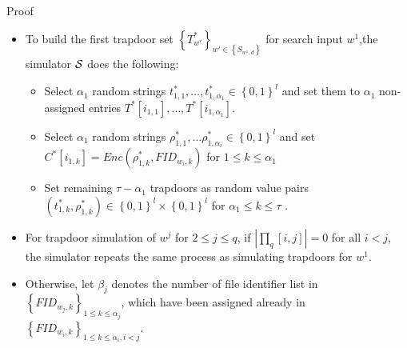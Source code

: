 \documentclass{beamer}
\begin{document}
\begin{frame}{Proof}
	\begin{itemize}
		\item To build the first trapdoor set ${\left\{ {T_{w'}^*} \right\}_{w' \in \left\{ {{S_{{w^1},d}}} \right\}}}$ for search input $w^1$,the simulator $\cal S$ does the following:
		\begin{itemize}
			\item Select ${\alpha_1}$ random strings $t_{1,1}^*, \ldots ,t_{1,{\alpha _1}}^* \in {\left\{ {0,1} \right\}^l}$ and set them to ${\alpha _1}$ non-assigned entries ${T^*}[{i_{1,1}}], \ldots ,{T^*}[{i_{1,{\alpha _1}}}]$.
			\item Select ${\alpha_1}$ random strings $\rho _{1,1}^*, \ldots \rho _{1,{\alpha _i}}^* \in {\left\{ {0,1} \right\}^l}$ and set ${C^*}[{i_{1,k}}] = Enc(\rho _{1,k}^*,FI{D_{{w_i},k}})$ for $1 \le k \le {\alpha _1}$
			\item Set remaining $\tau  - {\alpha _1}$ trapdoors as random value pairs
			$(t_{1,k}^*,\rho _{1,k}^*) \in {\left\{ {0,1} \right\}^l} \times {\left\{ {0,1} \right\}^l}$ for ${\alpha _1} \le k \le \tau $ .
		\end{itemize}
		\item For trapdoor simulation of $w^j$ for $2 \le j \le q$, if $\left| {{\prod _q}[i,j]} \right| = 0$ for all $i < j$, the simulator repeats the same process as
		simulating trapdoors for $w^1$.
		\item Otherwise, let ${\beta _j}$ denotes the number of file identifier list in ${\left\{ {FI{D_{{w_j},k}}} \right\}_{1 \le k \le {\alpha _j}}}$, which have
		been assigned already in ${\left\{ {FI{D_{{w_i},k}}} \right\}_{1 \le k \le {\alpha _i},i < j}}$.
	\end{itemize}
\end{frame}
\end{document}
